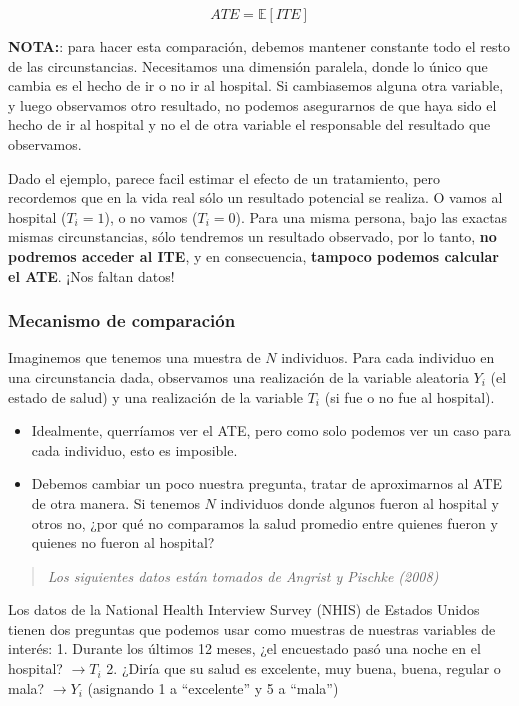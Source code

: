 \documentclass[
  a4paper,
  DIV=11,
  numbers=noendperiod]{scrreprt}
\providecommand{\tightlist}{%
  \setlength{\itemsep}{0pt}\setlength{\parskip}{0pt}}\usepackage{longtable,booktabs,array}
\begin{document}
\[
 ATE = \mathbb{E}[ITE]
\]

\textbf{NOTA:}: para hacer esta comparación, debemos mantener constante
todo el resto de las circunstancias. Necesitamos una dimensión paralela,
donde lo único que cambia es el hecho de ir o no ir al hospital. Si
cambiasemos alguna otra variable, y luego observamos otro resultado, no
podemos asegurarnos de que haya sido el hecho de ir al hospital y no el
de otra variable el responsable del resultado que observamos.

Dado el ejemplo, parece facil estimar el efecto de un tratamiento, pero
recordemos que en la vida real sólo un resultado potencial se realiza. O
vamos al hospital (\(T_i = 1\)), o no vamos (\(T_i = 0\)). Para una
misma persona, bajo las exactas mismas circunstancias, sólo tendremos un
resultado observado, por lo tanto, \textbf{no podremos acceder al ITE},
y en consecuencia, \textbf{tampoco podemos calcular el ATE}. ¡Nos faltan
datos!

\subsubsection{Mecanismo de
comparación}\label{mecanismo-de-comparaciuxf3n}

Imaginemos que tenemos una muestra de \(N\) individuos. Para cada
individuo en una circunstancia dada, observamos una realización de la
variable aleatoria \(Y_i\) (el estado de salud) y una realización de la
variable \(T_i\) (si fue o no fue al hospital).

\begin{itemize}
\tightlist
\item
  Idealmente, querríamos ver el ATE, pero como solo podemos ver un caso
  para cada individuo, esto es imposible.
\item
  Debemos cambiar un poco nuestra pregunta, tratar de aproximarnos al
  ATE de otra manera. Si tenemos \(N\) individuos donde algunos fueron
  al hospital y otros no, ¿por qué no comparamos la salud promedio entre
  quienes fueron y quienes no fueron al hospital?
\end{itemize}

\begin{quote}
\emph{Los siguientes datos están tomados de Angrist y Pischke (2008)}
\end{quote}

Los datos de la National Health Interview Survey (NHIS) de Estados
Unidos tienen dos preguntas que podemos usar como muestras de nuestras
variables de interés: 1. Durante los últimos 12 meses, ¿el encuestado
pasó una noche en el hospital? \(\rightarrow T_i\) 2. ¿Diría que su
salud es excelente, muy buena, buena, regular o mala?
\(\rightarrow Y_i\) (asignando 1 a ``excelente'' y 5 a ``mala'')
\end{document}
